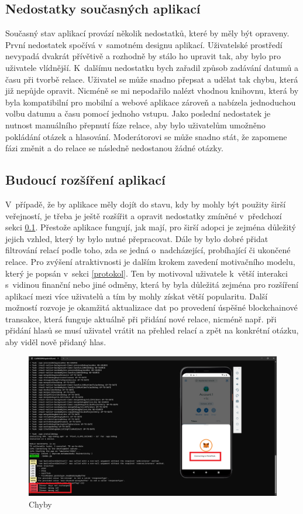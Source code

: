 \subsection{Nedostatky současných aplikací}
\label{nedostatky}
Současný stav aplikací provází několik nedostatků, které by měly být opraveny. První nedostatek spočívá v~samotném designu aplikací. Uživatelské prostředí nevypadá dvakrát přívětivě a rozhodně by stálo ho upravit tak, aby bylo pro uživatele vlídnější. K~dalšímu nedostatku bych zařadil způsob zadávání datumů a času při tvorbě relace. Uživatel se může snadno přepsat a udělat tak chybu, která již nepůjde opravit. Nicméně se mi nepodařilo nalézt vhodnou knihovnu, která by byla kompatibilní pro mobilní a webové aplikace zároveň a nabízela jednoduchou volbu datumu a času pomocí jednoho vstupu. Jako poslední nedostatek je nutnost manuálního přepnutí fáze relace, aby bylo uživatelům umožněno pokládání otázek a hlasování. Moderátorovi se může snadno stát, že zapomene fázi změnit a do relace se následně nedostanou žádné otázky.
\subsection{Budoucí rozšíření aplikací}
V~případě, že by aplikace měly dojít do stavu, kdy by mohly být použity širší veřejností, je třeba je ještě rozšířit a opravit nedostatky zmíněné v~předchozí sekci \ref{nedostatky}. Přestože aplikace fungují, jak mají, pro širší adopci je zejména důležitý jejich vzhled, který by bylo nutné přepracovat. Dále by bylo dobré přidat filtrování relací podle toho, zda se jedná o~nadcházející, probíhající či ukončené relace. Pro zvýšení atraktivnosti je dalším krokem zavedení motivačního modelu, který je popsán v~sekci \ref{protokol}. Ten by motivoval uživatele k~větší interakci s~vidinou finanční nebo jiné odměny, která by byla důležitá zejména pro rozšíření aplikací mezi více uživatelů a tím by mohly získat větší popularitu. Další možností rozvoje je okamžitá aktualizace dat po provedení úspěšné blockchainové transakce, která funguje aktuálně při přidání nové relace, nicméně např. při přidání hlasů se musí uživatel vrátit na přehled relací a zpět na konkrétní otázku, aby viděl nově přidaný hlas.

\begin{figure}
\centering
\includegraphics[width=\linewidth]{obrazky/dukaz.png}
\caption{Chyby}
\label{fig:chyby}
\end{figure}

